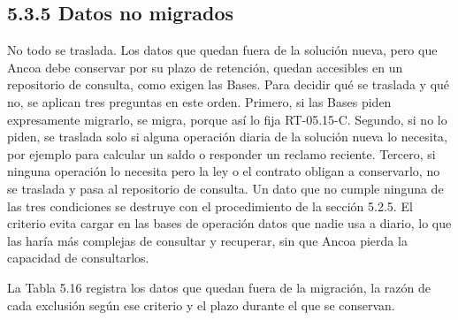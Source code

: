 \documentclass[11pt]{article}
\begin{document}
\subsection{5.3.5 Datos no migrados}

No todo se traslada. Los datos que quedan fuera de la solución nueva, pero que Ancoa debe conservar por su plazo de retención, quedan accesibles en un repositorio de consulta, como exigen las Bases. Para decidir qué se traslada y qué no, se aplican tres preguntas en este orden. Primero, si las Bases piden expresamente migrarlo, se migra, porque así lo fija RT-05.15-C. Segundo, si no lo piden, se traslada solo si alguna operación diaria de la solución nueva lo necesita, por ejemplo para calcular un saldo o responder un reclamo reciente. Tercero, si ninguna operación lo necesita pero la ley o el contrato obligan a conservarlo, no se traslada y pasa al repositorio de consulta. Un dato que no cumple ninguna de las tres condiciones se destruye con el procedimiento de la sección 5.2.5. El criterio evita cargar en las bases de operación datos que nadie usa a diario, lo que las haría más complejas de consultar y recuperar, sin que Ancoa pierda la capacidad de consultarlos.

La Tabla 5.16 registra los datos que quedan fuera de la migración, la razón de cada exclusión según ese criterio y el plazo durante el que se conservan.
\end{document}
